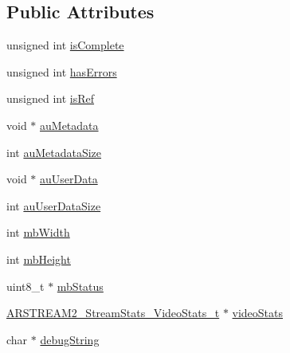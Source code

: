 \subsection*{Public Attributes}
\begin{DoxyCompactItemize}
\item 
unsigned int \hyperlink{struct_a_r_s_t_r_e_a_m2___stream_receiver___au_ready_callback_metadata__t_a677f5cdd043997b549ae33c9f3f39c30}{is\+Complete}
\item 
unsigned int \hyperlink{struct_a_r_s_t_r_e_a_m2___stream_receiver___au_ready_callback_metadata__t_a56013dffa3904c5ea127cf0dc99e7dc2}{has\+Errors}
\item 
unsigned int \hyperlink{struct_a_r_s_t_r_e_a_m2___stream_receiver___au_ready_callback_metadata__t_ae7a75a41024bb1a98170db808fefa566}{is\+Ref}
\item 
void $\ast$ \hyperlink{struct_a_r_s_t_r_e_a_m2___stream_receiver___au_ready_callback_metadata__t_adf923399d9fe6d8e42b66c1050c19eee}{au\+Metadata}
\item 
int \hyperlink{struct_a_r_s_t_r_e_a_m2___stream_receiver___au_ready_callback_metadata__t_a9f27f6dd1a7501bd8f74ecfe8fb8a602}{au\+Metadata\+Size}
\item 
void $\ast$ \hyperlink{struct_a_r_s_t_r_e_a_m2___stream_receiver___au_ready_callback_metadata__t_ab0c95e308f74b030877619bf98df3a50}{au\+User\+Data}
\item 
int \hyperlink{struct_a_r_s_t_r_e_a_m2___stream_receiver___au_ready_callback_metadata__t_a37a19531fa4183f4776298cf26af3204}{au\+User\+Data\+Size}
\item 
int \hyperlink{struct_a_r_s_t_r_e_a_m2___stream_receiver___au_ready_callback_metadata__t_a5095970e24e3cdf0ea809a02cb71fd60}{mb\+Width}
\item 
int \hyperlink{struct_a_r_s_t_r_e_a_m2___stream_receiver___au_ready_callback_metadata__t_a34bb026eccf7acf2d33699726ded3c62}{mb\+Height}
\item 
uint8\+\_\+t $\ast$ \hyperlink{struct_a_r_s_t_r_e_a_m2___stream_receiver___au_ready_callback_metadata__t_ac29dceb0bf4c4d5433292761b0fdf3c7}{mb\+Status}
\item 
\hyperlink{struct_a_r_s_t_r_e_a_m2___stream_stats___video_stats__t}{A\+R\+S\+T\+R\+E\+A\+M2\+\_\+\+Stream\+Stats\+\_\+\+Video\+Stats\+\_\+t} $\ast$ \hyperlink{struct_a_r_s_t_r_e_a_m2___stream_receiver___au_ready_callback_metadata__t_aee133d4eab1751aef189496539027ea1}{video\+Stats}
\item 
char $\ast$ \hyperlink{struct_a_r_s_t_r_e_a_m2___stream_receiver___au_ready_callback_metadata__t_ad586f9d836027398b190bc9bd12c9a9e}{debug\+String}
\end{DoxyCompactItemize}


